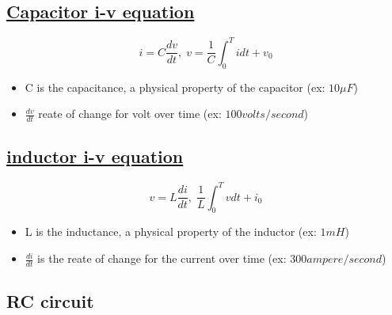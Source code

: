 \documentclass{article}
\begin{document}
\subsection{\href{https://www.khanacademy.org/science/electrical-engineering/ee-circuit-analysis-topic/ee-natural-and-forced-response/a/ee-capacitor-equation-in-action}{Capacitor i-v equation}}
\begin{equation}
  i=C\frac{dv}{dt}, \; v=\frac{1}{C}\int^T_0 idt + v_0 
\end{equation}
\begin{itemize}
    \item C is the capacitance, a physical property of the capacitor (ex: $10\mu F$)
    \item $\frac{dv}{dt}$ reate of change for volt over time (ex: $100 volts/second$)
\end{itemize}

\subsection{\href{https://www.khanacademy.org/science/electrical-engineering/ee-circuit-analysis-topic/ee-natural-and-forced-response/a/wmc-inductor-in-action}{inductor i-v equation}}
\begin{equation}
  v=L\frac{di}{dt}, \; \frac{1}{L}\int^T_0 vdt + i_0
\end{equation}
\begin{itemize}
    \item L is the inductance, a physical property of the inductor (ex: $1mH$)
    \item $\frac{di}{dt}$ is the reate of change for the current over time (ex: $300 ampere/second$)
\end{itemize}

\newpage
\subsection{RC circuit}
\end{document}
